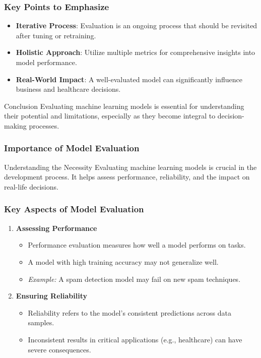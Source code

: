 \documentclass[aspectratio=169]{beamer}
\begin{document}
\begin{frame}[fragile]
    \frametitle{Key Points to Emphasize}
    \begin{itemize}
        \item \textbf{Iterative Process}: Evaluation is an ongoing process that should be revisited after tuning or retraining.
        \item \textbf{Holistic Approach}: Utilize multiple metrics for comprehensive insights into model performance.
        \item \textbf{Real-World Impact}: A well-evaluated model can significantly influence business and healthcare decisions.
    \end{itemize}

    \begin{block}{Conclusion}
        Evaluating machine learning models is essential for understanding their potential and limitations, especially as they become integral to decision-making processes.
    \end{block}
\end{frame}

\begin{frame}[fragile]
    \frametitle{Importance of Model Evaluation}
    \begin{block}{Understanding the Necessity}
        Evaluating machine learning models is crucial in the development process. It helps assess performance, reliability, and the impact on real-life decisions.
    \end{block}
\end{frame}

\begin{frame}[fragile]
    \frametitle{Key Aspects of Model Evaluation}
    \begin{enumerate}
        \item \textbf{Assessing Performance}
            \begin{itemize}
                \item Performance evaluation measures how well a model performs on tasks.
                \item A model with high training accuracy may not generalize well.
                \item \textit{Example:} A spam detection model may fail on new spam techniques.
            \end{itemize}
        
        \item \textbf{Ensuring Reliability}
            \begin{itemize}
                \item Reliability refers to the model's consistent predictions across data samples.
                \item Inconsistent results in critical applications (e.g., healthcare) can have severe consequences.
            \end{itemize}
    \end{enumerate}
\end{frame}
\end{document}

